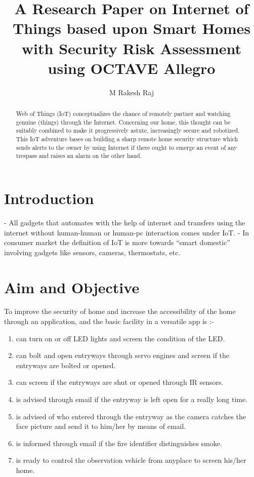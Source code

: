 \documentclass[12pt, letterpaper]{article}
\begin{document}
\title{A Research Paper on Internet of Things based
upon Smart Homes with Security Risk
Assessment using OCTAVE Allegro}

\author{M Rakesh Raj}

\maketitle

\begin{abstract}
Web of Things (IoT) conceptualizes the chance of remotely partner and
watching genuine (things) through the Internet. Concerning our home, this
thought can be suitably combined to make it progressively astute,
increasingly secure and robotized. This IoT adventure bases on building a
sharp remote home security structure which sends alerts to the owner by using
Internet if there ought to emerge an event of any trespass and raises an
alarm on the other hand.
\end{abstract}

\hspace{1cm}

\section{Introduction}
- All gadgets that automates with the help of internet and transfers using the internet without human-human or human-pc interaction comes under IoT.
- In consumer market the definition of IoT is more towards “smart domestic” involving gadgets like sensors, cameras, thermostats, etc.

\hspace{1cm}

\section{Aim and Objective}
To improve the security of home and increase the accessibility of the home
through an application, and the basic facility in a versatile app is :-
\begin{enumerate}
\item can turn on or off LED lights and screen the condition of the LED.
\item can bolt and open entryways through servo engines and screen if the entryways are bolted or opened.
\item can screen if the entryways are shut or opened through IR sensors.
\item is advised through email if the entryway is left open for a really long time.
\item is advised of who entered through the entryway as the camera catches the face picture and send it to him/her by means of email.
\item is informed through email if the fire identifier distinguishes smoke.
\item is ready to control the observation vehicle from anyplace to screen his/her home.
\end{enumerate}
\end{document}
